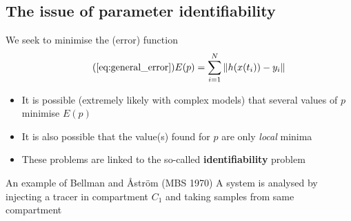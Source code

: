 \documentclass[aspectratio=169]{beamer}
\begin{document}

\subsection{The issue of parameter identifiability}

\begin{frame}{}
    We seek to minimise the (error) function
    \begin{equation}\tag{\ref{eq:general_error}}
        E(p) = \sum_{i=1}^N \|h(x(t_i))-y_i\|
    \end{equation}
    \vfill
    \begin{itemize}
        \item It is possible (extremely likely with complex models) that several values of $p$ minimise $E(p)$
        \item It is also possible that the value(s) found for $p$ are only \emph{local} minima 
        \item These problems are linked to the so-called \textbf{identifiability} problem
    \end{itemize}
\end{frame}

\begin{frame}{An example of Bellman and \r{A}str\"om (MBS 1970)}
    A system is analysed by injecting a tracer in compartment $C_1$ and taking samples from same compartment
    \begin{center}
        \def\vertskip{*1.75}
        \def\horzskip{*2}
    \end{center}  
\end{frame}
\end{document}

